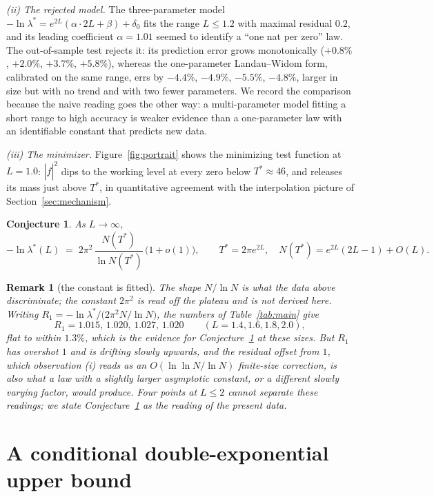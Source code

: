﻿\documentclass[11pt]{article}
\newtheorem{conjecture}[theorem]{Conjecture}
\newtheorem{remark}[theorem]{Remark}
\newcommand{\lmin}{\lambda^{*}}
\newcommand{\Tstar}{T^{*}}
\newcommand{\fhat}{\hat f}
\begin{document}
\emph{(ii) The rejected model.}  The three-parameter model
$-\ln\lmin=e^{2L}(\alpha\cdot2L+\beta)+\delta_0$ fits the range
$L\le1.2$ with maximal residual $0.2$, and its leading coefficient
$\alpha=1.01$ seemed to identify a ``one nat per zero'' law.  The
out-of-sample test rejects it: its prediction error grows monotonically
($+0.8\%$, $+2.0\%$, $+3.7\%$, $+5.8\%$), whereas the one-parameter
Landau--Widom form, calibrated on the same range, errs by $-4.4\%$,
$-4.9\%$, $-5.5\%$, $-4.8\%$, larger in size but with no trend and with
two fewer parameters.  We record the comparison because the naive
reading goes the other way: a multi-parameter model fitting a short
range to high accuracy is weaker evidence than a one-parameter law
with an identifiable constant that predicts new data.

\emph{(iii) The minimizer.}  Figure~\ref{fig:portrait} shows the
minimizing test function at $L=1.0$: $|\fhat|^{2}$ dips to the working
level at every zero below $\Tstar\approx46$, and releases its mass
just above $\Tstar$, in quantitative agreement with the interpolation
picture of Section~\ref{sec:mechanism}.

\begin{conjecture}\label{conj:law}
As $L\to\infty$,
\[
  -\ln\lmin(L)\;=\;2\pi^{2}\,\frac{N(\Tstar)}{\ln N(\Tstar)}
  \,\bigl(1+o(1)\bigr),
  \qquad \Tstar=2\pi e^{2L},\quad
  N(\Tstar)=e^{2L}(2L-1)+O(L).
\]
\end{conjecture}

\begin{remark}[the constant is fitted]
\label{rem:rival}
The shape $N/\ln N$ is what the data above discriminate; the constant
$2\pi^{2}$ is read off the plateau and is not derived here.  Writing
$R_{1}=-\ln\lmin/\bigl(2\pi^{2}N/\ln N\bigr)$, the numbers of
Table~\ref{tab:main} give
\[
  R_{1}=1.015,\,1.020,\,1.027,\,1.020
  \qquad (L=1.4,1.6,1.8,2.0),
\]
flat to within $1.3\%$, which is the evidence for
Conjecture~\ref{conj:law} at these sizes.  But $R_{1}$ has overshot $1$
and is drifting slowly upwards, and the residual offset from $1$, which
observation (i) reads as an $O(\ln\ln N/\ln N)$ finite-size correction,
is also what a law with a slightly larger asymptotic constant, or a
different slowly varying factor, would produce.  Four points at $L\le2$
cannot separate these readings; we state Conjecture~\ref{conj:law} as
the reading of the present data.
\end{remark}

\section{A conditional double-exponential upper bound}
\label{sec:theorem}
\end{document}
